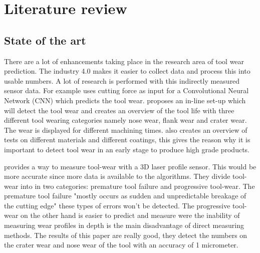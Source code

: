 
\chapter{Literature review}
\label{chap:lit}

\section{State of the art}

           
		There are a lot of enhancements taking place in the research area of tool wear prediction. The industry 4.0 makes it easier to collect data and process this into usable numbers. 
		A lot of research is performed with this indirectly measured sensor data. For example \cite{Ma2020} uses cutting force as input for a Convolutional Neural Network (CNN) which predicts the tool wear.
		 \cite{Li2013} proposes an in-line set-up which will detect the tool wear and creates an overview of the tool life with three different tool wearing categories namely nose wear, flank wear and crater wear. The wear is displayed for different machining times.  \citeauthor{Li2013} also creates an overview of tests on different materials and different coatings, this gives the reason why it is important to detect tool wear in an early stage to produce high grade products.
		
		 \cite{Cerce2015} provides a way to measure tool-wear with a 3D laser profile sensor. This would be more accurate since more data is available to the algorithms. They divide tool-wear into in two categories: premature tool failure and progressive tool-wear. The premature tool failure "mostly occurs as sudden and unpredictable breakage of the cutting edge" these types of errors won't be detected. The progressive tool-wear on the other hand is easier to predict and measure were the inability of measuring wear profiles in depth is the main disadvantage of direct measuring methods. The results of this paper are really good, they detect the numbers on the crater wear and nose wear of the tool with an accuracy of 1 micrometer. 
		 

